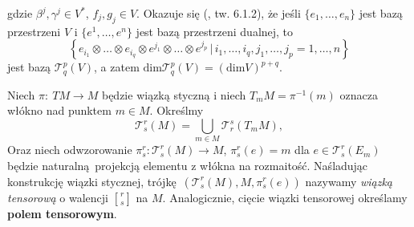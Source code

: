 gdzie \(\beta^j, \gamma^j \in V^\ast\), \(f_j, g_j\in V\).
Okazuje się (\cite{marsden}, tw. 6.1.2), że jeśli \(\{e_1, \dots, e_n\}\) jest bazą przestrzeni \(V\) i \(\{e^1, \dots, e^n\}\) jest bazą przestrzeni dualnej, to
\begin{equation*}
    \left\{e_{i_1} \otimes \dots \otimes e_{i_q} \otimes e^{j_1} \otimes \dots \otimes e^{j_p} \, | \, i_1, \dots, i_q, j_1, \dots, j_p = 1, \dots, n \right\} 
\end{equation*}
jest bazą \(\mathcal{T}_q^p(V)\), a zatem \(\mathrm{dim}\mathcal{T}_q^p(V) = (\mathrm{dim}V)^{p+q}\). 

Niech \(\pi:\:TM\to M\) będzie wiązką styczną i niech \(T_m M = \pi^{-1}(m)\) oznacza włókno nad punktem \(m\in M\). Określmy
\begin{equation*}
    \mathcal{T}_s^r(M)=\bigcup\limits_{m\in M} \mathcal{T}_r^s(T_m M),
\end{equation*}
Oraz niech odwzorowanie \(\pi_s^r:\mathcal{T}_s^r(M)\to M\), \(\pi_s^r(e) = m\) dla \(e\in \mathcal{T}_s^r(E_m)\) będzie naturalną projekcją elementu z włókna na rozmaitość. Naśladując konstrukcję wiązki stycznej, trójkę \((\mathcal{T}_s^r(M), M, \pi_s^r(e))\) nazywamy \emph{wiązką tensorową} o walencji \(r \brack s\) na \(M\). Analogicznie, cięcie wiązki tensorowej określamy \textbf{polem tensorowym}. 

